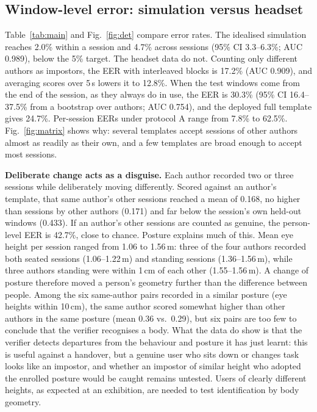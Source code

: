 \subsection{Window-level error: simulation versus headset}
Table~\ref{tab:main} and Fig.~\ref{fig:det} compare error rates. The idealised simulation reaches 2.0\% within a session and 4.7\% across sessions (95\% CI 3.3--6.3\%; AUC 0.989), below the 5\% target. The headset data do not. Counting only different authors as impostors, the EER with interleaved blocks is 17.2\% (AUC 0.909), and averaging scores over 5\,s lowers it to 12.8\%. When the test windows come from the end of the session, as they always do in use, the EER is 30.3\% (95\% CI 16.4--37.5\% from a bootstrap over authors; AUC 0.754), and the deployed full template gives 24.7\%. Per-session EERs under protocol A range from 7.8\% to 62.5\%. Fig.~\ref{fig:matrix} shows why: several templates accept sessions of other authors almost as readily as their own, and a few templates are broad enough to accept most sessions.

\textbf{Deliberate change acts as a disguise.} Each author recorded two or three sessions while deliberately moving differently. Scored against an author's template, that same author's other sessions reached a mean of 0.168, no higher than sessions by other authors (0.171) and far below the session's own held-out windows (0.433). If an author's other sessions are counted as genuine, the person-level EER is 42.7\%, close to chance. Posture explains much of this. Mean eye height per session ranged from 1.06 to 1.56\,m: three of the four authors recorded both seated sessions (1.06--1.22\,m) and standing sessions (1.36--1.56\,m), while three authors standing were within 1\,cm of each other (1.55--1.56\,m). A change of posture therefore moved a person's geometry further than the difference between people. Among the six same-author pairs recorded in a similar posture (eye heights within 10\,cm), the same author scored somewhat higher than other authors in the same posture (mean 0.36 vs.\ 0.29), but six pairs are too few to conclude that the verifier recognises a body. What the data do show is that the verifier detects departures from the behaviour and posture it has just learnt: this is useful against a handover, but a genuine user who sits down or changes task looks like an impostor, and whether an impostor of similar height who adopted the enrolled posture would be caught remains untested. Users of clearly different heights, as expected at an exhibition, are needed to test identification by body geometry.

